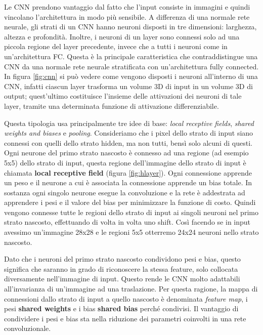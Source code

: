 \documentclass[twoside,twocolumn,10pt]{extarticle}
\theoremstyle{definition}
\begin{document}
Le CNN prendono vantaggio dal fatto che l'input consiste in immagini e quindi vincolano l'architettura in modo più sensibile. A differenza di una normale rete neurale, gli strati di un CNN hanno neuroni disposti in tre dimensioni: larghezza, altezza e profondità. Inoltre, i neuroni di un layer sono connessi solo ad una piccola regione del layer precedente, invece che a tutti i neuroni come in un'architettura FC.
Questa è la principale caratteristica che contraddistingue una CNN da una normale rete neurale stratificata con un'architettura fully connected. In figura \ref{fig:cnn} si può vedere come vengono disposti i neuroni all'interno di una CNN, infatti ciascun layer trasforma un volume 3D di input in un volume 3D di output; quest'ultimo costituisce l'insieme delle attivazioni dei neuroni di tale layer, tramite una determinata funzione di attivazione differenziabile.

Questa tipologia usa principalmente tre idee di base: \textit{local receptive fields}, \textit{shared weights and biases} e \textit{pooling}. 
Consideriamo che i pixel dello strato di input siano connessi con quelli dello strato hidden, ma non tutti, bensì solo alcuni di questi. Ogni neurone del primo strato nascosto è connesso ad una regione (ad esempio 5x5) dello strato di input, questa regione dell'immagine dello strato di input è chiamata \textbf{local receptive field} (figura \ref{fig:hlayer}). Ogni connessione apprende un peso e il neurone a cui è associata la connessione apprende un bias totale. In sostanza ogni singolo neurone esegue la convoluzione e la rete è addestrata ad apprendere i pesi e il valore del bias per minimizzare la funzione di costo. Quindi vengono connesse tutte le regioni dello strato di input ai singoli neuroni nel primo strato nascosto, effettuando di volta in volta uno shift. Così facendo se in input avessimo un'immagine 28x28 e le regioni 5x5 otterremo 24x24 neuroni nello strato nascosto.

Dato che i neuroni del primo strato nascosto condividono pesi e bias, questo significa che saranno in grado di riconoscere la stessa feature, solo collocata diversamente nell'immagine di input. Questo rende le CNN molto adattabili all'invarianza di un'immagine ad una traslazione. Per questa ragione, la mappa di connessioni dallo strato di input a quello nascosto è denominata \textit{feature map}, i pesi \textbf{shared weights} e i bias \textbf{shared bias} perché condivisi. Il vantaggio di condividere i pesi e bias sta nella riduzione dei parametri coinvolti in una rete convoluzionale.
\end{document}
